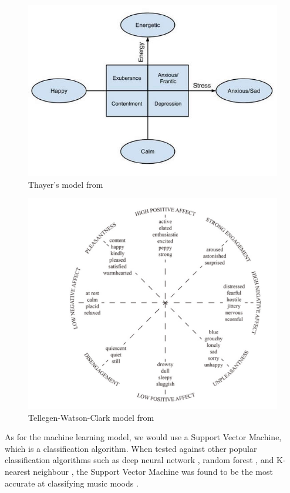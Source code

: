 \begin{figure}
    \centering
    \includegraphics[scale=0.4]{Figures/Thayers model}
    \decoRule
    \caption{Thayer's model from \cite{circumplexbook}}
    \label{fig:Thayers}
    \end{figure}

\begin{figure}
    \centering
    \includegraphics[scale=0.4]{Figures/TWC model}
    \decoRule
    \caption{Tellegen-Watson-Clark model from \cite{MoodIoT}}
    \label{fig:TWC}
    \end{figure}

As for the machine learning model, we would use a Support Vector Machine, which is a classification algorithm. When tested against other popular classification algorithms such as deep neural network \cite{MoodDeepNeuralNetwork}, random forest \cite{Moodrandomforest}, and K-nearest neighbour \cite{MoodKNeighbour} \cite{MoodDeepNeuralNetwork}, the Support Vector Machine was found to be the most accurate at classifying music moods \cite{MoodIoT}.

